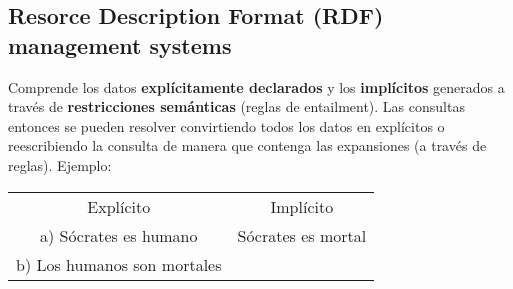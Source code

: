 \subsection*{Resorce Description Format (RDF) management systems}
Comprende los datos \textbf{explícitamente declarados} y los \textbf{implícitos} generados a través de \textbf{restricciones semánticas} (reglas de entailment). Las consultas entonces se pueden resolver convirtiendo todos los datos en explícitos o reescribiendo la consulta de manera que contenga las expansiones (a través de reglas). Ejemplo:

\begin{center}
    \ttfamily
    \begin{tabular}{c|c}
        Explícito & Implícito \\
        a) Sócrates es humano & Sócrates es mortal \\
        b) Los humanos son mortales
    \end{tabular}
\end{center}

